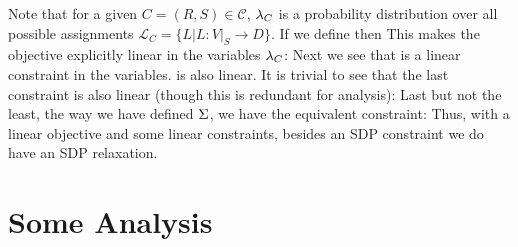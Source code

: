 Note that for a given $C =(R, S) \in \mathcal{C}$, $\lambda_C$ is a probability distribution over all possible assignments $\mathcal{L}_C = \{L | L: V|_S \rightarrow D\}$. 
If we define 
then 
This makes the objective explicitly linear in the variables $\lambda_C$:
Next we see that 
is a linear constraint in the variables. 
is also linear.
It is trivial to see that the last constraint is also linear (though this is redundant for analysis):
Last but not the least, the way we have defined $\Sigma$, we have the equivalent constraint:
Thus, with a linear objective and some linear constraints, besides an SDP constraint we do have an SDP relaxation.


\section{Some Analysis}

